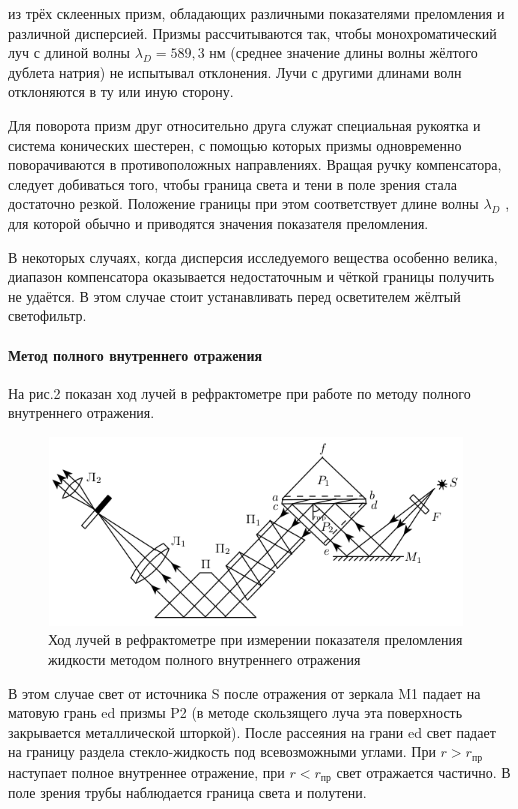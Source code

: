 \documentclass[12pt]{article}
\begin{document}
из трёх склеенных призм, обладающих различными показателями преломления и различной дисперсией. Призмы рассчитываются так, чтобы монохроматический луч с длиной волны $\lambda_D = 589,3$ нм (среднее значение длины волны жёлтого дублета натрия) не испытывал отклонения.
Лучи с другими длинами волн отклоняются в ту или иную сторону.
\par
	Для поворота призм друг относительно друга служат специальная рукоятка и система конических шестерен, с помощью которых призмы одновременно поворачиваются в противоположных направлениях. Вращая ручку компенсатора, следует добиваться того, чтобы граница света и тени в поле зрения стала достаточно резкой. Положение границы при этом соответствует длине волны $\lambda_D$ , для которой обычно и приводятся значения показателя преломления.
\par
	В некоторых случаях, когда дисперсия исследуемого вещества особенно велика, диапазон компенсатора оказывается недостаточным и чёткой границы получить не удаётся. В этом случае стоит устанавливать перед осветителем жёлтый светофильтр.

\paragraph*{Метод полного внутреннего отражения}
\par
	На рис.2 показан ход лучей в рефрактометре при работе по методу полного внутреннего отражения.
	\begin{figure}[h!]
		\centering
		\includegraphics[width = 11cm, height = 5cm]{image2.png}
		\caption{Ход лучей в рефрактометре при измерении показателя преломления жидкости методом полного внутреннего отражения}
	\end{figure}
\par
	В этом случае свет от источника S после отражения от зеркала M1 падает на матовую грань ed призмы P2 (в методе скользящего луча эта поверхность закрывается металлической
шторкой). После рассеяния на грани ed свет падает на границу раздела стекло-жидкость под всевозможными углами. При $r > r_\text{пр}$ наступает полное внутреннее отражение, при $r < r_\text{пр}$ свет отражается частично. В поле зрения трубы наблюдается граница света и полутени.
\end{document}
